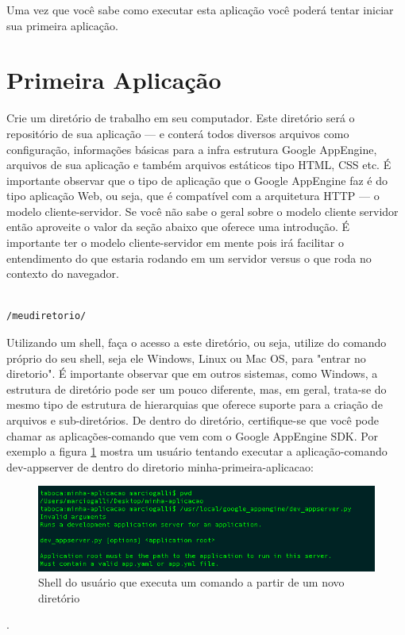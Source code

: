 \documentclass[a4paper]{article}
\begin{document}
Uma vez que você sabe como executar esta aplicação você poderá tentar iniciar sua primeira aplicação. 


\section{Primeira Aplicação}

Crie um diretório de trabalho em seu computador. Este diretório será o repositório de sua aplicação --- e conterá todos diversos arquivos como configuração, informações básicas para a infra estrutura Google AppEngine, arquivos de sua aplicação e também arquivos estáticos tipo HTML, CSS etc. É importante observar que o tipo de aplicação que o Google AppEngine faz é do tipo aplicação Web, ou seja, que é compatível com a arquitetura HTTP --- o modelo cliente-servidor. Se você não sabe o geral sobre o modelo cliente servidor então aproveite o valor da seção abaixo que oferece uma introdução. É importante ter o modelo cliente-servidor em mente pois irá facilitar o entendimento do que estaria rodando em um servidor versus o que roda no contexto do navegador. 

\begin{verbatim}

/meudiretorio/

\end{verbatim}

Utilizando um shell, faça o acesso a este diretório, ou seja, utilize do comando próprio do seu shell, seja ele Windows, Linux ou Mac OS, para "entrar no diretorio". É importante observar que em outros sistemas, como Windows, a estrutura de diretório pode ser um pouco diferente, mas, em geral, trata-se do mesmo tipo de estrutura de hierarquias que oferece suporte para a criação de arquivos e sub-diretórios. De dentro do diretório, certifique-se que você pode chamar as aplicações-comando que vem com o Google AppEngine SDK. Por exemplo a figura \ref{fig:image-shell-example} mostra um usuário tentando executar a aplicação-comando dev-appserver de dentro do diretorio minha-primeira-aplicacao: 

\begin{figure}[!h]
\centering
\includegraphics[width=5in]{image-shell-example.png}
\caption{Shell do usuário que executa um comando a partir de um novo diretório}
\label{fig:image-shell-example}
\end{figure}.
\end{document}
